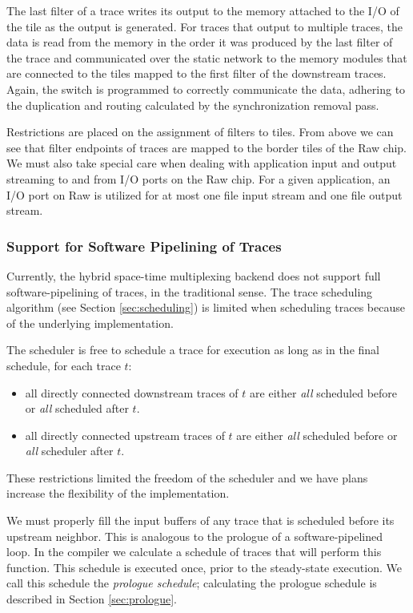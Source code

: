 The last filter of a trace writes its output to the memory attached to
the I/O of the tile as the output is generated. For traces that output
to multiple traces, the data is read from the memory in the order it
was produced by the last filter of the trace and communicated over the
static network to the memory modules that are connected to the tiles
mapped to the first filter of the downstream traces. Again, the switch
is programmed to correctly communicate the data, adhering to the
duplication and routing calculated by the synchronization removal
pass.

Restrictions are placed on the assignment of filters to tiles. From
above we can see that filter endpoints of traces are mapped to the
border tiles of the Raw chip. We must also take special care when
dealing with application input and output streaming to and from I/O
ports on the Raw chip.  For a given application, an I/O port on Raw is
utilized for at most one file input stream and one file output stream.

\subsubsection{Support for Software Pipelining of Traces}
\label{sec:softpipe}
Currently, the hybrid space-time multiplexing backend does not support
full software-pipelining of traces, in the traditional sense.  The
trace scheduling algorithm (see Section \ref{sec:scheduling}) is
limited when scheduling traces because of the underlying
implementation.

The scheduler is free to schedule a trace for execution as long as in
the final schedule, for each trace $t$:
\begin{itemize}
\item all directly connected downstream traces of $t$ are either {\it all}
scheduled before or {\it all} scheduled after $t$.
\item all directly connected upstream traces of $t$ are either {\it all}
scheduled before or {\it all} scheduler after $t$.
\end{itemize}
These restrictions limited the freedom of the scheduler and we have
plans increase the flexibility of the implementation.

We must properly fill the input buffers of any trace that is scheduled
before its upstream neighbor.  This is analogous to the prologue of a
software-pipelined loop.  In the compiler we calculate a schedule of
traces that will perform this function.  This schedule is executed
once, prior to the steady-state execution.  We call this schedule the
{\it prologue schedule}; calculating the prologue schedule is
described in Section \ref{sec:prologue}.
